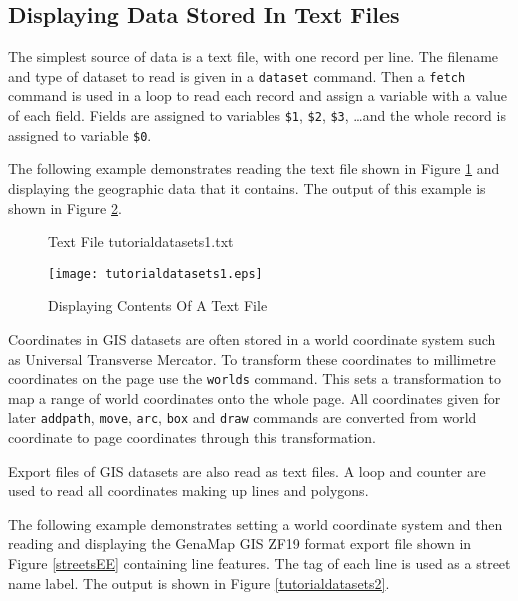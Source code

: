 \subsection{Displaying Data Stored In Text Files}

The simplest source of data is a text file, with one record per line.  The
filename and type of dataset to read is given in a \texttt{dataset} command.
Then a \texttt{fetch} command is used in a loop to read each record
and assign a variable with a value of each field.
Fields are assigned to variables
\texttt{\$1}, \texttt{\$2}, \texttt{\$3}, \dots and the whole record is
assigned to variable \texttt{\$0}.

The following example demonstrates reading the text file shown in Figure
\ref{tutorialdatasets1txt} and displaying the
geographic data that it contains.  The output of this example is shown in
Figure \ref{tutorialdatasets1}.

\begin{figure}[htb]

\caption{Text File tutorialdatasets1.txt}
\label{tutorialdatasets1txt}
\end{figure}



\begin{figure}[htb]
\texttt{[image: tutorialdatasets1.eps]}
\caption{Displaying Contents Of A Text File}
\label{tutorialdatasets1}
\end{figure}

Coordinates in GIS datasets are often stored
in a world coordinate system such as
Universal Transverse Mercator.  To transform these coordinates to millimetre
coordinates on the page use the \texttt{worlds} command.  This sets a
transformation to map a range of world coordinates onto the whole page.  All
coordinates given for later \texttt{addpath}, \texttt{move}, \texttt{arc},
\texttt{box} and
\texttt{draw} commands are converted from world coordinate to page coordinates
through this transformation.

Export files of GIS datasets are also read as text files.  A loop and counter
are used to read all coordinates making up lines and polygons.

The following example demonstrates setting a world coordinate system and then
reading and displaying the GenaMap GIS ZF19 format export file shown in Figure
\ref{streetsEE} containing line
features.  The tag of each line is used as a street name label.
The output is shown in Figure \ref{tutorialdatasets2}.

